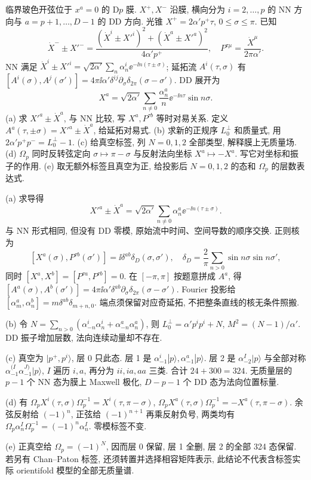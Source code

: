 \begin{exercise}
临界玻色开弦位于 $x^a=0$ 的 D$p$ 膜. $X^+,X^-$ 沿膜, 横向分为 $i=2,\ldots,p$ 的 NN 方向与 $a=p+1,\ldots,D-1$ 的 DD 方向. 光锥 $X^+=2\alpha'p^+\tau$, $0\leq\sigma\leq\pi$. 已知
\[
 \dot X^-\pm X'^-=\frac{(\dot X^i\pm X'^i)^2+
 (\dot X^a\pm X'^a)^2}{4\alpha'p^+},\quad
 P^{\tau\mu}=\frac{\dot X^\mu}{2\pi\alpha'}.
\]
NN 满足 $\dot X^i\pm X'^i=\sqrt{2\alpha'}\sum_n\alpha_n^i\ee^{-\ii n(\tau\pm\sigma)}$;
延拓流 $A^i(\tau,\sigma)$ 有
$[A^i(\sigma),A^j(\sigma')]=4\pi\ii\alpha'\delta^{ij}\partial_\sigma\delta_{2\pi}(\sigma-\sigma')$.
DD 展开为
\[
 X^a=\sqrt{2\alpha'}\sum_{n\ne0}\frac{\alpha_n^a}{n}
 \ee^{-\ii n\tau}\sin n\sigma.
\]
(a) 求 $X'^a\pm\dot X^a$, 与 NN 比较, 写 $X^a,P^{\tau b}$ 等时对易关系. 定义 $A^a(\tau,\pm\sigma)=X'^a\pm\dot X^a$, 给延拓对易式.
(b) 求新的正规序 $L_0^\perp$ 和质量式, 用 $2\alpha'p^+p^-=L_0^\perp-1$.
(c) 给真空标签, 列 $N=0,1,2$ 全部类型, 解释膜上无质量场.
(d) $\Omega_p$ 同时反转弦定向 $\sigma\mapsto\pi-\sigma$ 与反射法向坐标 $X^a\mapsto-X^a$. 写它对坐标和振子的作用.
(e) 取无额外标签且真空为正, 给投影后 $N=0,1,2$ 的态和 $\Omega_p$ 的层数表达式.
\end{exercise}
\begin{solution}
(a) 求导得
\[
 X'^a\pm\dot X^a=\sqrt{2\alpha'}\sum_{n\ne0}
 \alpha_n^a\ee^{-\ii n(\tau\pm\sigma)}.
\]
与 NN 形式相同, 但没有 DD 零模, 原始流中时间、空间导数的顺序交换. 正则核为
\[
 [X^a(\sigma),P^{\tau b}(\sigma')]=\ii\delta^{ab}\delta_D(\sigma,\sigma'),
 \quad\delta_D=\frac2\pi\sum_{n>0}\sin n\sigma\sin n\sigma',
\]
同时 $[X^a,X^b]=[P^{\tau a},P^{\tau b}]=0$. 在 $[-\pi,\pi]$ 按题意拼成 $A^a$, 得
$[A^a(\sigma),A^b(\sigma')]=4\pi\ii\alpha'\delta^{ab}\partial_\sigma\delta_{2\pi}(\sigma-\sigma')$.
Fourier 投影给 $[\alpha_m^a,\alpha_n^b]=m\delta^{ab}\delta_{m+n,0}$. 端点须保留对应奇延拓, 不把整条直线的核无条件照搬.

(b) 令 $N=\sum_{n>0}(\alpha_{-n}^i\alpha_n^i+\alpha_{-n}^a\alpha_n^a)$, 则
$L_0^\perp=\alpha'p^ip^i+N$, $M^2=(N-1)/\alpha'$.
DD 振子增加层数, 法向连续动量却不存在.

(c) 真空为 $|p^+,p^i\rangle$, 层 0 只此态. 层 1 是
$\alpha_{-1}^i|p\rangle,\alpha_{-1}^a|p\rangle$.
层 2 是 $\alpha_{-2}^I|p\rangle$ 与全部对称
$\alpha_{-1}^{(I}\alpha_{-1}^{J)}|p\rangle$, $I$ 遍历 $i,a$, 再分为 $ii,ia,aa$ 三类. 合计 $24+300=324$. 无质量层的 $p-1$ 个 NN 态为膜上 Maxwell 极化, $D-p-1$ 个 DD 态为法向位置标量.

(d) 有
$\Omega_pX^i(\tau,\sigma)\Omega_p^{-1}=X^i(\tau,\pi-\sigma)$,
$\Omega_pX^a(\tau,\sigma)\Omega_p^{-1}=-X^a(\tau,\pi-\sigma)$.
余弦反射给 $(-1)^n$, 正弦给 $(-1)^{n+1}$ 再乘反射负号, 两类均有
$\Omega_p\alpha_n^I\Omega_p^{-1}=(-1)^n\alpha_n^I$.
零模标签不变.

(e) 正真空给 $\Omega_p=(-1)^N$, 因而层 0 保留, 层 1 全删, 层 2 的全部 324 态保留. 若另有 Chan--Paton 标签, 还须转置并选择相容矩阵表示, 此结论不代表含标签实际 orientifold 模型的全部无质量谱.
\end{solution}

